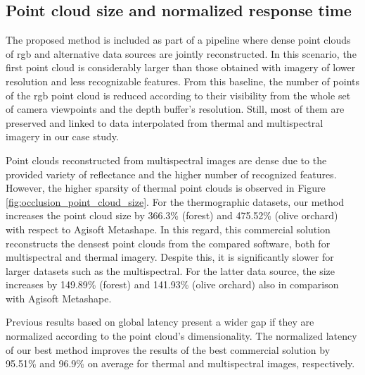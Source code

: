 
\subsection{Point cloud size and normalized response time}

The proposed method is included as part of a pipeline where dense point clouds of \acrshort{rgb} and alternative data sources are jointly reconstructed. In this scenario, the first point cloud is considerably larger than those obtained with imagery of lower resolution and less recognizable features. From this baseline, the number of points of the \acrshort{rgb} point cloud is reduced according to their visibility from the whole set of camera viewpoints and the depth buffer's resolution. Still, most of them are preserved and linked to data interpolated from thermal and multispectral imagery in our case study. 

Point clouds reconstructed from multispectral images are dense due to the provided variety of reflectance and the higher number of recognized features. However, the higher sparsity of thermal point clouds is observed in Figure \ref{fig:occlusion_point_cloud_size}. For the thermographic datasets, our method increases the point cloud size by 366.3\% (forest) and 475.52\% (olive orchard) with respect to Agisoft Metashape. In this regard, this commercial solution reconstructs the densest point clouds from the compared software, both for multispectral and thermal imagery. Despite this, it is significantly slower for larger datasets such as the multispectral. For the latter data source, the size increases by 149.89\% (forest) and 141.93\% (olive orchard) also in comparison with Agisoft Metashape.

Previous results based on global latency present a wider gap if they are normalized according to the point cloud's dimensionality. The normalized latency of our best method improves the results of the best commercial solution by 95.51\% and 96.9\% on average for thermal and multispectral images, respectively. 

